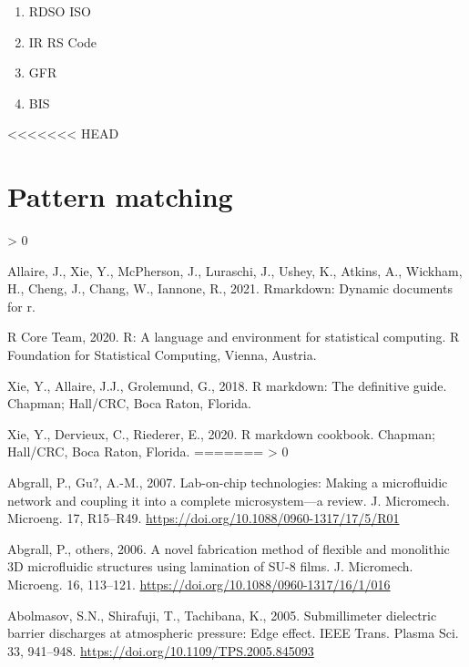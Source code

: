 \documentclass[
  11pt,
  twoside]{article}
\providecommand{\tightlist}{%
  \setlength{\itemsep}{0pt}\setlength{\parskip}{0pt}}
\newlength{\cslhangindent}
\newenvironment{CSLReferences}[2] %
 {%
  \setlength{\parindent}{0pt}
  \ifodd #1 \everypar{\setlength{\hangindent}{\cslhangindent}}\ignorespaces\fi
  \ifnum #2 > 0
  \setlength{\parskip}{#2\baselineskip}
  \fi
 }%
 {}
\begin{document}
\begin{enumerate}
\def\labelenumi{\arabic{enumi}.}
\tightlist
\item
  RDSO ISO
\item
  IR RS Code
\item
  GFR
\item
  BIS
\end{enumerate}

<<<<<<< HEAD
\hypertarget{pattern-matching}{%
\section{Pattern matching}\label{pattern-matching}}



\hypertarget{refs}{}
\begin{CSLReferences}{1}{0}
\leavevmode\hypertarget{ref-R-rmarkdown}{}%
Allaire, J., Xie, Y., McPherson, J., Luraschi, J., Ushey, K., Atkins,
A., Wickham, H., Cheng, J., Chang, W., Iannone, R., 2021. Rmarkdown:
Dynamic documents for r.

\leavevmode\hypertarget{ref-R-base}{}%
R Core Team, 2020. R: A language and environment for statistical
computing. R Foundation for Statistical Computing, Vienna, Austria.

\leavevmode\hypertarget{ref-rmarkdown2018}{}%
Xie, Y., Allaire, J.J., Grolemund, G., 2018. R markdown: The definitive
guide. Chapman; Hall/CRC, Boca Raton, Florida.

\leavevmode\hypertarget{ref-rmarkdown2020}{}%
Xie, Y., Dervieux, C., Riederer, E., 2020. R markdown cookbook. Chapman;
Hall/CRC, Boca Raton, Florida.
=======
\hypertarget{refs}{}
\begin{CSLReferences}{1}{0}
\leavevmode\hypertarget{ref-EMPad20}{}%
Abgrall, P., Gu?, A.-M., 2007. Lab-on-chip technologies: Making a microfluidic network and coupling it into a complete microsystem---a review. J. Micromech. Microeng. 17, R15--R49. \url{https://doi.org/10.1088/0960-1317/17/5/R01}

\leavevmode\hypertarget{ref-Abgr06}{}%
Abgrall, P., others, 2006. A novel fabrication method of flexible and monolithic {3D microfluidic structures using lamination of SU-8} films. J. Micromech. Microeng. 16, 113--121. \url{https://doi.org/10.1088/0960-1317/16/1/016}

\leavevmode\hypertarget{ref-Abol05}{}%
Abolmasov, S.N., Shirafuji, T., Tachibana, K., 2005. Submillimeter dielectric barrier discharges at atmospheric pressure: Edge effect. IEEE Trans. Plasma Sci. 33, 941--948. \url{https://doi.org/10.1109/TPS.2005.845093}


\end{CSLReferences}
\end{CSLReferences}
\end{document}
